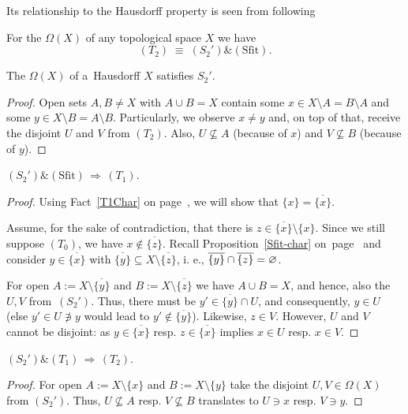 Its relationship to the Hausdorff property is seen from following
\begin{thm} \label{thm:T2=S2'+Sfit}
  For the $\Omega(X)$ of any topological space $X$ we have
  \[
    (T_2) \; \equiv \; (S_2') \& (\text{Sfit}).
  \]
\end{thm}

\begin{lem} \label{Haus->S2'}
  The $\Omega(X)$ of a~Hausdorff $X$ satisfies $S_2'$.
\end{lem}
\begin{proof}
  Open sets $A, B \ne X$ with $A \cup B = X$ contain some $x\in X\setminus A =
  B\setminus A$ and some $y\in X\setminus B = A\setminus B$.
  Particularly, we observe $x \ne y$ and, on top of that, receive the disjoint
  $U$ and $V$ from $(T_2)$.
  Also, $U\not\subseteq A$ (because of $x$) and $V\not\subseteq B$ (because of
  $y$).
\end{proof}

\begin{lem} \label{lem:S2'+Sfit->T1}
  $(S_2') \& (\text{Sfit}) \, \Rightarrow \, (T_1)$.
\end{lem}
\begin{proof}
  Using Fact~\ref{T1Char} on page~\pageref{T1Char}, we will show that $\{ x \}
  = \overline{\{ x \}}$.

  Assume, for the sake of contradiction, that there is $z\in \overline{\{ x \}}
  \setminus \{ x \}$.
  Since we still suppose $(T_0)$, we have $x\not\in \overline{\{ z \}}$.
  Recall Proposition~\ref{Sfit-char} on~page~\pageref{Sfit-char} and consider
  $y\in \overline{\{x\}}$ with $\overline{\{y\}} \subseteq X\setminus
  \overline{\{ z \}}$, i. e., $\overline{\{ y \}} \cap \overline{\{ z \}} =
  \varnothing$.

  For open $A := X \setminus \overline{\{ y \}}$ and $B := X \setminus
  \overline{\{ z \}}$ we have $A \cup B = X$, and hence, also the $U, V$
  from~$(S_2')$.
  Thus, there must be $y'\in \overline{\{ y \}} \cap U$, and consequently,
  $y\in U$ (else $y'\in U\not\owns y$ would lead to $y'\not\in \overline{\{ y
  \}}$).
  Likewise, $z\in V$.
  However, $U$ and $V$ cannot be disjoint:
  as $y\in \overline{\{ x \}}$ resp. $z\in \overline{\{ x \}}$ implies $x\in U$
  resp. $x\in V$.
\end{proof}

\begin{lem} \label{lem:S2'+T1->T2}
  $(S_2') \& (T_1) \, \Rightarrow \, (T_2)$.
\end{lem}
\begin{proof}
  For open $A := X\setminus \{ x \}$ and $B := X\setminus \{ y \}$ take the
  disjoint $U, V\in \Omega(X)$ from $(S_2')$.
  Thus, $U\not\subseteq A$ resp. $V\not\subseteq B$ translates to $U\owns x$
  resp. $V\owns y$.
\end{proof}


